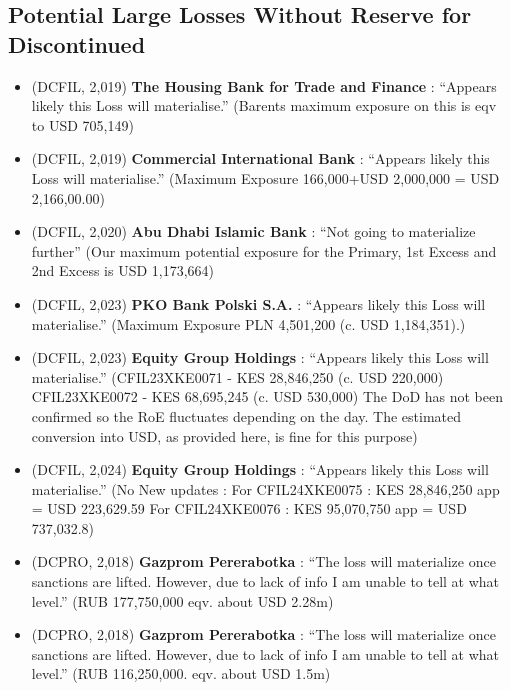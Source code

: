 
\subsection*{Potential Large Losses Without Reserve for Discontinued}

\begin{itemize}

  \item (DCFIL, 2,019) \textbf{ The Housing Bank for Trade and Finance }: ``Appears likely this Loss will materialise.'' (Barents maximum exposure on this is eqv to USD 705,149)

  \item (DCFIL, 2,019) \textbf{ Commercial International Bank }: ``Appears likely this Loss will materialise.'' (Maximum Exposure 166,000+USD 2,000,000 = USD 2,166,00.00)

  \item (DCFIL, 2,020) \textbf{ Abu Dhabi Islamic Bank }: ``Not going to materialize further'' (Our maximum potential exposure for the Primary, 1st Excess and 2nd Excess is USD 1,173,664)

  \item (DCFIL, 2,023) \textbf{ PKO Bank Polski S.A. }: ``Appears likely this Loss will materialise.'' (Maximum Exposure PLN 4,501,200 (c. USD 1,184,351).)

  \item (DCFIL, 2,023) \textbf{ Equity Group Holdings }: ``Appears likely this Loss will materialise.'' (CFIL23XKE0071 - KES 28,846,250 (c. USD 220,000) CFIL23XKE0072 - KES 68,695,245 (c. USD 530,000) The DoD has not been confirmed so the RoE fluctuates depending on the day. The estimated conversion into USD, as provided here, is fine for this purpose)

  \item (DCFIL, 2,024) \textbf{ Equity Group Holdings }: ``Appears likely this Loss will materialise.'' (No New updates : For CFIL24XKE0075 : KES 28,846,250 app = USD 223,629.59 For CFIL24XKE0076 : KES 95,070,750 app = USD 737,032.8)

  \item (DCPRO, 2,018) \textbf{ Gazprom Pererabotka }: ``The loss will materialize once sanctions are lifted. However, due to lack of info I am unable to tell at what level.'' (RUB 177,750,000 eqv. about USD 2.28m)

  \item (DCPRO, 2,018) \textbf{ Gazprom Pererabotka }: ``The loss will materialize once sanctions are lifted. However, due to lack of info I am unable to tell at what level.'' (RUB 116,250,000. eqv. about USD 1.5m)


\end{itemize}
